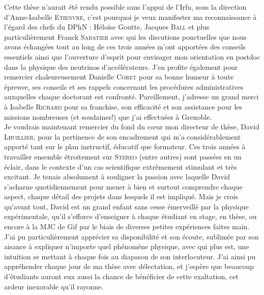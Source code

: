 Cette thèse n'aurait été rendu possible sans l'appui de l'Irfu, sous la direction d'Anne-Isabelle \textsc{Etienvre}, c'est pourquoi je veux manifester ma reconnaissance à l'égard des chefs du DPhN : Héloïse Goutte, Jacques \textsc{Ball} et plus particulièrement Franck \textsc{Sabatier} avec qui les discutions ponctuelles que nous avons échangées tout au long de ces trois années m'ont apportées des conseils essentiels ainsi que l'ouverture d'esprit pour envisager mon orientation en postdoc dans la physique des neutrinos d'accélérateurs. J'en profite également pour remercier chaleureusement Danielle \textsc{Coret} pour sa bonne humeur à toute épreuve, ses conseils et ses rappels concernant les procédures administratives auxquelles chaque doctorant est confronté. Pareillement, j'adresse un grand merci à Isabelle \textsc{Richard} pour sa franchise, son efficacité et son assistance pour les missions nombreuses (et soudaines!) que j'ai effectuées à Grenoble.\\



Je voudrais maintenant remercier du fond du c\oe ur mon directeur de thèse, David \textsc{Lhuillier}, pour la pertinence de son encadrement qui m'a considérablement apporté tant sur le plan instructif, éducatif que formateur. Ces trois années à travailler ensemble étroitement sur \textsc{Stereo} (entre autres) sont passées en un éclair, dans le contexte d'un cas scientifique extrêmement stimulant et très excitant. Je tenais absolument à souligner la passion avec laquelle David s'acharne quotidiennement pour mener à bien et surtout comprendre chaque aspect, chaque détail des projets dans lesquels il est impliqué. Mais je crois qu'avant tout, David est un grand enfant sans cesse émerveillé par la physique expérimentale, qu'il s'efforce d'enseigner à chaque étudiant en stage, en thèse, ou encore à la MJC de Gif par le biais de diverses petites expériences faites main. J'ai pu particulièrement apprécier sa disponibilité et son écoute, sublimée par son aisance à expliquer n'importe quel phénomène physique, avec qui plus est, une intuition se mettant à chaque fois au diapason de son interlocuteur. J'ai ainsi pu appréhender chaque jour de ma thèse avec délectation, et j'espère que beaucoup d'étudiants auront eux aussi la chance de bénéficier de cette exaltation, cet ardeur inexorable qu'il rayonne.\\

